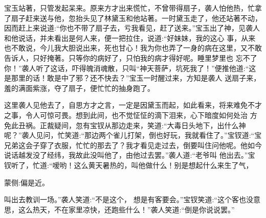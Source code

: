 \begin{parag}
    宝玉站著，只管发起呆来。原来方才出来慌忙，不曾带得扇子，袭人怕他热，忙拿了扇子赶来送与他，忽抬头见了林黛玉和他站著。一时黛玉走了，他还站著不动，因而赶上来说道:“你也不带了扇子去，亏我看见，赶了送来。”宝玉出了神，见袭人和他说话，并未看出是何人来，便一把拉住，说道:“好妹妹，我的这心 事，从来也不敢说，今儿我大胆说出来，死也甘心！我为你也弄了一身的病在这里，又不敢告诉人，只好掩著。只等你的病好了，只怕我的病才得好呢。睡里梦里也 忘不了你！”袭人听了这话，吓得魄消魂散，只叫“神天菩萨，坑死我了！”便推他道:“这是那里的话！敢是中了邪？还不快去？”宝玉一时醒过来，方知是袭人 送扇子来，羞的满面紫涨，夺了扇子，便忙忙的抽身跑了。
\end{parag}


\begin{parag}
    这里袭人见他去了，自思方才之言，一定是因黛玉而起，如此看来，将来难免不才之事，令人可惊可畏。想到此间，也不觉怔怔的滴下泪来，心下暗度如何处治 方免此丑祸。正裁疑间，忽有宝钗从那边走来，笑道:“大毒日头地下，出什么神呢？”袭人见问，忙笑道:“那边两个雀儿打架，倒也好玩，我就看住了。”宝钗道:“宝兄弟这会子穿了衣服，忙忙的那去了？我才看见走过去，倒要叫住问他呢。他如今说话越发没了经纬，我故此没叫他了，由他过去罢。”袭人道:“老爷叫 他出去。”宝钗听了，忙道:“嗳哟！这么黄天暑热的，叫他做什么！别是想起什么来生了气，\begin{note}蒙侧:偏是近。\end{note}叫出去教训一场。”袭人笑道:“不是这个， 想是有客要会。”宝钗笑道:“这个客也没意思，这么热天，不在家里凉快，还跑些什么！”袭人笑道:“倒是你说说罢。”
\end{parag}


